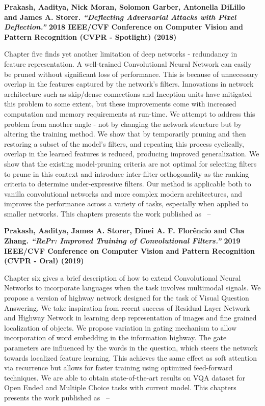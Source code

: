 \noindent\textbf{
Prakash, Aaditya, Nick Moran, Solomon Garber, Antonella DiLillo and James A. Storer. \textit{``Deflecting Adversarial Attacks with Pixel Deflection.''} 2018 IEEE/CVF Conference on Computer Vision and Pattern Recognition (CVPR - Spotlight) (2018)
}
\vspace{2em}

Chapter five finds yet another limitation of deep networks - redundancy in feature representation.
A well-trained Convolutional Neural Network can easily be pruned without significant loss of performance. This is because of unnecessary overlap in the features captured by the network's filters. Innovations in network architecture such as skip/dense connections and Inception units have mitigated this problem to some extent, but these improvements come with increased computation and memory requirements at run-time. We attempt to address this problem from another angle - not by changing the network structure but by altering the training method. We show that by temporarily pruning and then restoring a subset of the model's filters, and repeating this process cyclically, overlap in the learned features is reduced, producing improved generalization. We show that the existing model-pruning criteria are not optimal for selecting filters to prune in this context and introduce inter-filter orthogonality as the ranking criteria to determine under-expressive filters. Our method is applicable both to vanilla convolutional networks and more complex modern architectures, and improves the performance across a variety of tasks, especially when applied to smaller networks.
This chapters presents the work published as ~\cite{Prakash2018RePrIT}--

\noindent\textbf{
Prakash, Aaditya, James A. Storer, Dinei A. F. Florêncio and Cha Zhang. \textit{``RePr: Improved Training of Convolutional Filters.''} 2019 IEEE/CVF Conference on Computer Vision and Pattern Recognition (CVPR - Oral) (2019)
}
\vspace{2em}

Chapter six gives a brief description of how to extend Convolutional Neural Networks to incorporate languages when the task involves multimodal signals.
We propose a version of highway network designed for the task of Visual Question Answering. We take inspiration from recent success of Residual Layer Network and Highway Network in learning deep representation of images and fine grained localization of objects. We propose variation in gating mechanism to allow incorporation of word embedding in the information highway. The gate parameters are influenced by the words in the question, which steers the network towards localized feature learning. This achieves the same effect as soft attention via recurrence but allows for faster training using optimized feed-forward techniques. We are able to obtain state-of-the-art results on VQA dataset for Open Ended and Multiple Choice tasks with current model.
This chapters presents the work published as ~\cite{Prakash2016HighwayNF}--

